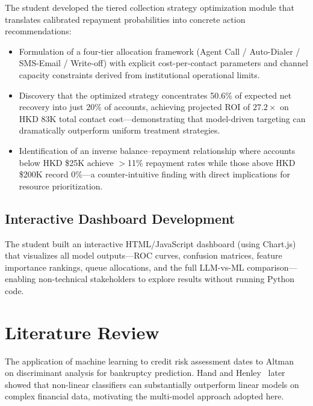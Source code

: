 \documentclass[12pt, a4paper]{article}
\begin{document}
The student developed the tiered collection strategy optimization module that translates calibrated repayment probabilities into concrete action recommendations:
\begin{itemize}[leftmargin=*]
    \item Formulation of a four-tier allocation framework (Agent Call / Auto-Dialer / SMS-Email / Write-off) with explicit cost-per-contact parameters and channel capacity constraints derived from institutional operational limits.
    
    \item Discovery that the optimized strategy concentrates 50.6\% of expected net recovery into just 20\% of accounts, achieving projected ROI of $27.2\times$ on HKD 83K total contact cost---demonstrating that model-driven targeting can dramatically outperform uniform treatment strategies.
    
    \item Identification of an inverse balance--repayment relationship where accounts below HKD \$25K achieve $>$11\% repayment rates while those above HKD \$200K record 0\%---a counter-intuitive finding with direct implications for resource prioritization.
\end{itemize}

\subsection{Interactive Dashboard Development}

The student built an interactive HTML/JavaScript dashboard (using Chart.js) that visualizes all model outputs---ROC curves, confusion matrices, feature importance rankings, queue allocations, and the full LLM-vs-ML comparison---enabling non-technical stakeholders to explore results without running Python code.


\section{Literature Review}\label{sec:litreview}

The application of machine learning to credit risk assessment dates to Altman~\cite{altman1968} on discriminant analysis for bankruptcy prediction. Hand and Henley~\cite{hand1997} later showed that non-linear classifiers can substantially outperform linear models on complex financial data, motivating the multi-model approach adopted here.
\end{document}
